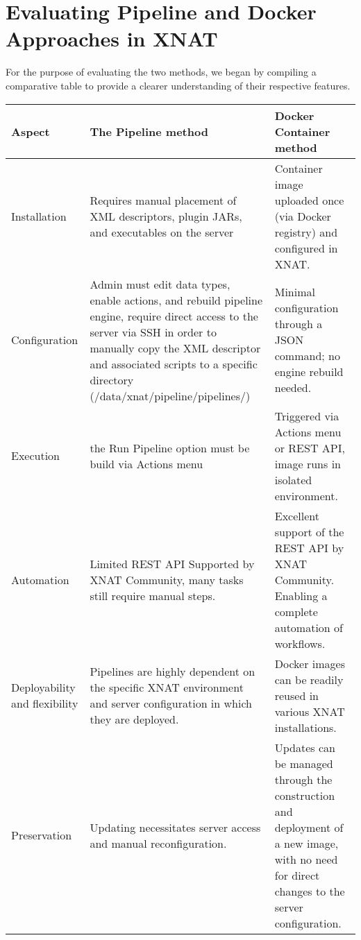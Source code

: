\section{Evaluating Pipeline and Docker Approaches in XNAT}

For the purpose of evaluating the two methods, we began by compiling a comparative table to provide a clearer understanding of their respective features. 

\begin{table}[H]
    \centering
      \begin{tabular}{|>{\centering\arraybackslash}p{4cm}|
                    >{\centering\arraybackslash}p{5cm}|
                    >{\centering\arraybackslash}p{5cm}|}
    \hline
    \textbf{Aspect} & \textbf{The Pipeline method} & \textbf{Docker Container method}\\ \hline
     Installation & Requires manual placement of XML descriptors, plugin JARs, and executables on the server& Container image uploaded once (via Docker registry) and configured in XNAT. \\ \hline
    Configuration & Admin must edit data types, enable actions, and rebuild pipeline engine, require direct access to the server via SSH in order to manually copy the XML
descriptor and associated scripts to a specific directory (/data/xnat/pipeline/pipelines/)& Minimal configuration through a JSON command; no engine rebuild needed. \\ \hline
Execution & the Run Pipeline option must be build via Actions menu  & Triggered via Actions menu or REST API, image runs in isolated environment. \\ \hline
Automation & Limited REST API Supported by XNAT Community, many tasks still require manual steps.& Excellent support of the REST API by XNAT Community. Enabling a complete automation of workflows. \\ \hline
Deployability and flexibility & Pipelines are highly dependent on the specific XNAT environment and server configuration in which they are deployed. & Docker images can be readily reused in various XNAT installations.\\ \hline
Preservation & Updating necessitates server access and manual reconfiguration.& Updates can be managed through the construction and deployment of a new image, with no need for direct changes to the server configuration.\\ \hline


\end{tabular}
\end{table}
